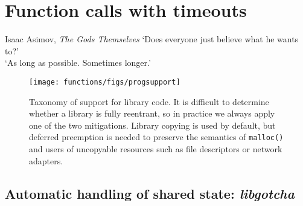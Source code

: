\chapter{Function calls with timeouts}
\label{chap:functions}

\ifdefined\chapquotes
\begin{chapquote}{Isaac Asimov, \textit{The Gods Themselves}}
`Does everyone just believe what he wants to?' \\
`As long as possible.  Sometimes longer.'
\end{chapquote}
\fi

\begin{figure}
\begin{center}
\texttt{[image: functions/figs/progsupport]}
\end{center}
\caption{Taxonomy of support for library code.  It is difficult to determine whether
a library is fully reentrant, so in practice we always
apply one of the two mitigations.  Library copying is used by default, but deferred
preemption is needed to preserve the semantics of \texttt{malloc()} and users of
uncopyable resources such as file descriptors or network adapters.}
\label{fig:progsupport}
\end{figure}

\begin{swallowsections}
\begin{swallowfigures}

\end{swallowfigures}
\end{swallowsections}





\section{Automatic handling of shared state: \textit{libgotcha}}

\begin{swallowsubsections}

\end{swallowsubsections}

